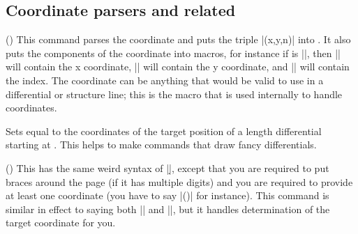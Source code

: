 \begin{sseqdata}[name = basic, cohomological Serre grading]
\subsection{Coordinate parsers and related}
\begin{command}{\parsecoordinate{}()}%
This command parses the coordinate and puts the triple |(x,y,n)| into
. It also puts the components of the coordinate into macros, for
instance if  is |\coord|, then |\xcoord| will contain the x
coordinate, |\ycoord| will contain the y coordinate, and |\ncoord| will contain
the index. The coordinate can be anything that would be valid to use in a
differential or structure line; this is the macro that is used internally to
handle coordinates.
\end{command}

\begin{command}{\getdtarget{}\pars{\sourcecoord}}%
Sets  equal to the coordinates of the target position of a length
 differential starting at \sourcecoord. This helps to make commands
that draw fancy differentials.
\end{command}

\begin{command}{\parsedifferential{}()}%
This has the same weird syntax of |\d|, except that you are required to put
braces around the page (if it has multiple digits) and you are required to
provide at least one coordinate (you have to say
|(\lastclass)| for instance). This command is similar in
effect to saying both |\parsecoordinate\source{}| and
|\parsecoordinate\target{}|, but it handles determination
of the target coordinate for you.



\end{command}
\end{sseqdata}
